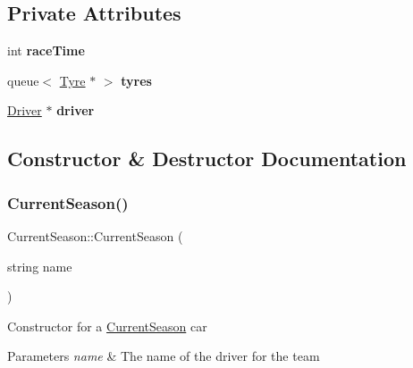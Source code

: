 \subsection*{Private Attributes}
\begin{DoxyCompactItemize}
\item 
\mbox{\label{classCurrentSeason_a92f14a563c7bdf84911ed9734893f6c0}} 
int {\bfseries race\+Time}
\item 
\mbox{\label{classCurrentSeason_aed2ab33910558290b014c07b94fee05f}} 
queue$<$ \hyperlink{classTyre}{Tyre} $\ast$ $>$ {\bfseries tyres}
\item 
\mbox{\label{classCurrentSeason_a0734273443a0540c94cfa914e2719a4f}} 
\hyperlink{classDriver}{Driver} $\ast$ {\bfseries driver}
\end{DoxyCompactItemize}


\subsection{Constructor \& Destructor Documentation}
\mbox{\label{classCurrentSeason_a65af23c148bf8745199232459753955f}} 
\subsubsection{\texorpdfstring{Current\+Season()}{CurrentSeason()}}
{\footnotesize\ttfamily Current\+Season\+::\+Current\+Season (\begin{DoxyParamCaption}\item[{string}]{name }\end{DoxyParamCaption})}

Constructor for a \hyperlink{classCurrentSeason}{Current\+Season} car 
\begin{DoxyParams}{Parameters}
{\em name} & The name of the driver for the team \\
\hline
\end{DoxyParams}
\mbox{\label{classCurrentSeason_a5f5b214667194da480939a33ada4efae}} 
